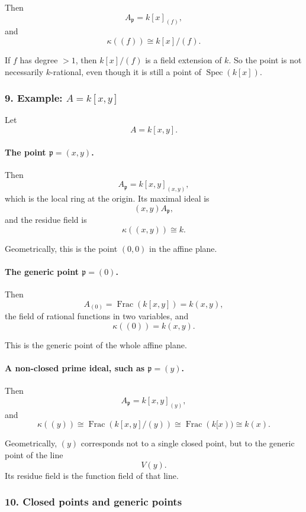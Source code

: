 \documentclass[12pt,a4paper]{article}
\theoremstyle{notespace}
\newcommand{\Spec}{\operatorname{Spec}}
\theoremstyle{definition}
\begin{document}
Then
\[
A_{\mathfrak p}=k[x]_{(f)},
\]
and
\[
\kappa((f))
\cong
k[x]/(f).
\]

If \(f\) has degree \(>1\), then \(k[x]/(f)\) is a field extension of \(k\). So the point is not necessarily \(k\)-rational, even though it is still a point of \(\Spec(k[x])\).

\subsubsection{9. Example: \(A=k[x,y]\)}

Let
\[
A=k[x,y].
\]

\paragraph{The point \(\mathfrak p=(x,y)\).}

Then
\[
A_{\mathfrak p}=k[x,y]_{(x,y)},
\]
which is the local ring at the origin. Its maximal ideal is
\[
(x,y)A_{\mathfrak p},
\]
and the residue field is
\[
\kappa((x,y))
\cong
k.
\]

Geometrically, this is the point \((0,0)\) in the affine plane.

\paragraph{The generic point \(\mathfrak p=(0)\).}

Then
\[
A_{(0)}=\operatorname{Frac}(k[x,y])=k(x,y),
\]
the field of rational functions in two variables, and
\[
\kappa((0))=k(x,y).
\]

This is the generic point of the whole affine plane.

\paragraph{A non-closed prime ideal, such as \(\mathfrak p=(y)\).}

Then
\[
A_{\mathfrak p}=k[x,y]_{(y)},
\]
and
\[
\kappa((y))
\cong
\operatorname{Frac}(k[x,y]/(y))
\cong
\operatorname{Frac}(k[x))
\cong
k(x).
\]

Geometrically, \((y)\) corresponds not to a single closed point, but to the generic point of the line
\[
V(y).
\]
Its residue field is the function field of that line.

\subsubsection{10. Closed points and generic points}
\end{document}
